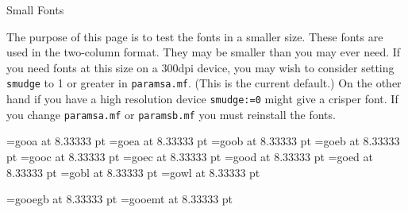 \vfil\eject
{\centerline{\titlefont Small Fonts}
\bigbreak

\rm
The purpose of this page is to test the fonts in a smaller size. These
fonts are used in the two-column format. They may be smaller than you may ever
need. If you need fonts at this size on a 300dpi device, you may wish to
consider setting {\tt smudge} to 1 or greater in {\tt paramsa.mf}. (This
is the current default.) On the other hand if you have a high resolution
device {\tt smudge:=0} might give a crisper font. If you change 
{\tt paramsa.mf} or {\tt paramsb.mf} you must reinstall the fonts.

\font\gooa=gooa at 8.33333 pt
\font\goea=goea at 8.33333 pt
\font\goob=goob at 8.33333 pt
\font\goeb=goeb at 8.33333 pt
\font\gooc=gooc at 8.33333 pt
\font\goec=goec at 8.33333 pt
\font\good=good at 8.33333 pt
\font\goed=goed at 8.33333 pt
\font\gobl=gobl at 8.33333 pt
\font\gowl=gowl at 8.33333 pt

\font\gooegb=gooegb at 8.33333 pt
\font\gooemt=gooemt at 8.33333 pt
\def\goo{\offinterlineskip\parindent=0pt\parskip=0pt\obeylines
  \def\0##1##2##3{\if##1?\gooegb ##3 \else \gooa\char##1##2 \fi}%
  \def\1##1##2##3{\if##1?\gooegb ##3 \else \goob\char##1##2 \fi}%
  \def\2##1##2##3{\if##1?\gooegb ##3 \else \gooc\char##1##2 \fi}%
  \def\3##1##2##3{\if##1?\gooegb ##3 \else \good\char##1##2 \fi}%
  \def\-##1##2{\gooegb ##1 }%
  \def\!##1{\hbox to 10pt{\hfil\raise3pt\hbox{\eighti ##1}\hfil}}%
}
\def\goe{\offinterlineskip\parindent=0pt\parskip=0pt\obeylines
  \def\0##1##2##3{\if##1?\gooegb ##3 \else \goea\char##1##2 \fi}%
  \def\1##1##2##3{\if##1?\gooegb ##3 \else \goeb\char##1##2 \fi}%
  \def\2##1##2##3{\if##1?\gooegb ##3 \else \goec\char##1##2 \fi}%
  \def\3##1##2##3{\if##1?\gooegb ##3 \else \goed\char##1##2 \fi}%
  \def\-##1##2{\gooegb ##1 }%
  \def\!##1{\hbox to 10pt{\hfil\raise3pt\hbox{\eighti ##1}\hfil}}%
}

}
